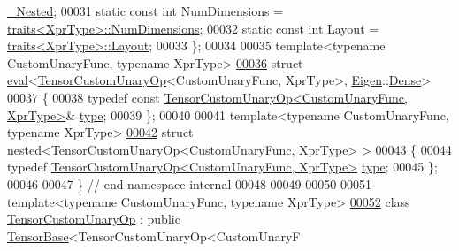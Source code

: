 \begin{DoxyCode}
      \hyperlink{group___sparse_core___module}{\_Nested};
00031   \textcolor{keyword}{static} \textcolor{keyword}{const} \textcolor{keywordtype}{int} NumDimensions = \hyperlink{struct_eigen_1_1internal_1_1traits}{traits<XprType>::NumDimensions};
00032   \textcolor{keyword}{static} \textcolor{keyword}{const} \textcolor{keywordtype}{int} Layout = \hyperlink{struct_eigen_1_1internal_1_1traits}{traits<XprType>::Layout};
00033 \};
00034 
00035 \textcolor{keyword}{template}<\textcolor{keyword}{typename} CustomUnaryFunc, \textcolor{keyword}{typename} XprType>
\hyperlink{struct_eigen_1_1internal_1_1eval_3_01_tensor_custom_unary_op_3_01_custom_unary_func_00_01_xpr_ty453212bf40fc24f334a0deb6823dd342}{00036} \textcolor{keyword}{struct }\hyperlink{struct_eigen_1_1internal_1_1eval}{eval}<\hyperlink{class_eigen_1_1_tensor_custom_unary_op}{TensorCustomUnaryOp}<CustomUnaryFunc, XprType>, 
      \hyperlink{namespace_eigen}{Eigen}::\hyperlink{struct_eigen_1_1_dense}{Dense}>
00037 \{
00038   \textcolor{keyword}{typedef} \textcolor{keyword}{const} \hyperlink{class_eigen_1_1_tensor_custom_unary_op}{TensorCustomUnaryOp<CustomUnaryFunc, XprType>}&
       \hyperlink{class_eigen_1_1_tensor_custom_unary_op}{type};
00039 \};
00040 
00041 \textcolor{keyword}{template}<\textcolor{keyword}{typename} CustomUnaryFunc, \textcolor{keyword}{typename} XprType>
\hyperlink{struct_eigen_1_1internal_1_1nested_3_01_tensor_custom_unary_op_3_01_custom_unary_func_00_01_xpr_type_01_4_01_4}{00042} \textcolor{keyword}{struct }\hyperlink{struct_eigen_1_1internal_1_1nested}{nested}<\hyperlink{class_eigen_1_1_tensor_custom_unary_op}{TensorCustomUnaryOp}<CustomUnaryFunc, XprType> >
00043 \{
00044   \textcolor{keyword}{typedef} \hyperlink{class_eigen_1_1_tensor_custom_unary_op}{TensorCustomUnaryOp<CustomUnaryFunc, XprType>} 
      \hyperlink{class_eigen_1_1_tensor_custom_unary_op}{type};
00045 \};
00046 
00047 \}  \textcolor{comment}{// end namespace internal}
00048 
00049 
00050 
00051 \textcolor{keyword}{template}<\textcolor{keyword}{typename} CustomUnaryFunc, \textcolor{keyword}{typename} XprType>
\hyperlink{class_eigen_1_1_tensor_custom_unary_op}{00052} \textcolor{keyword}{class }\hyperlink{class_eigen_1_1_tensor_custom_unary_op}{TensorCustomUnaryOp} : \textcolor{keyword}{public} \hyperlink{class_eigen_1_1_tensor_base}{TensorBase}<TensorCustomUnaryOp<CustomUnaryF

\end{DoxyCode}
